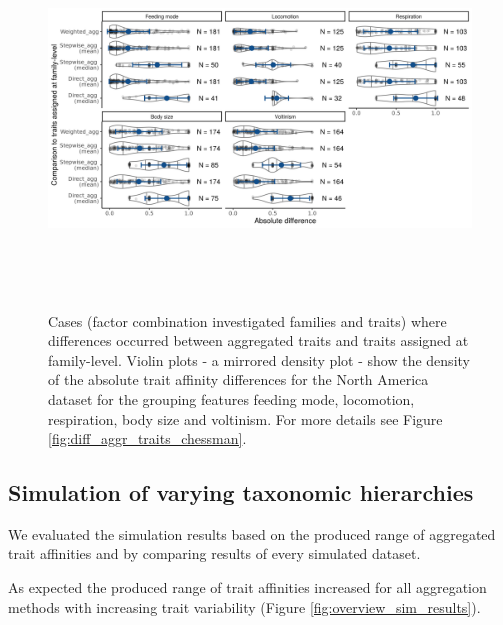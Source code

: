 \documentclass{article}
\begin{document}
\begin{figure}[H]
  \centering
  \includegraphics[width=16.5cm, height=10cm]{Deviances_trait_agg_pyne.png}
  \caption{Cases (factor combination investigated families and traits) where differences occurred between aggregated traits and traits assigned at family-level. Violin plots - a mirrored density plot - show the density of the absolute trait affinity differences for the North America dataset for the grouping features feeding mode, locomotion, respiration, body size and voltinism. For more details see Figure \ref{fig:diff_aggr_traits_chessman}.}
  \label{fig:diff_aggr_traits_pyne}
\end{figure}

\newpage 


\subsection*{Simulation of varying taxonomic hierarchies}

We evaluated the simulation results based on the produced range of aggregated trait affinities and by comparing results of every simulated dataset. 

As expected the produced range of trait affinities increased for all aggregation methods with increasing trait variability (Figure \ref{fig:overview_sim_results}).%
 
 
\end{document}

